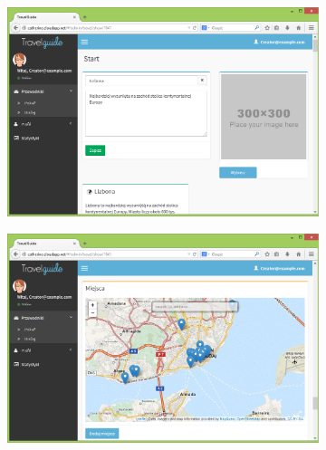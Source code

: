 \documentclass{book}
\begin{document}
		\begin{figure}[H]
			\ContinuedFloat
			
			\begin{subfigure}{1\textwidth}
				\includegraphics[width=\textwidth]{screenshots/web/7edycja.png}					
				\caption{\label{subfig:web_edit}}
			\end{subfigure}
			\hfill
			\begin{subfigure}{1\textwidth}
				\includegraphics[width=\textwidth]{screenshots/web/8edycja2.png}	
				\caption{\label{subfig:web_edit2}}
			\end{subfigure}
			
		\end{figure}
\end{document}
